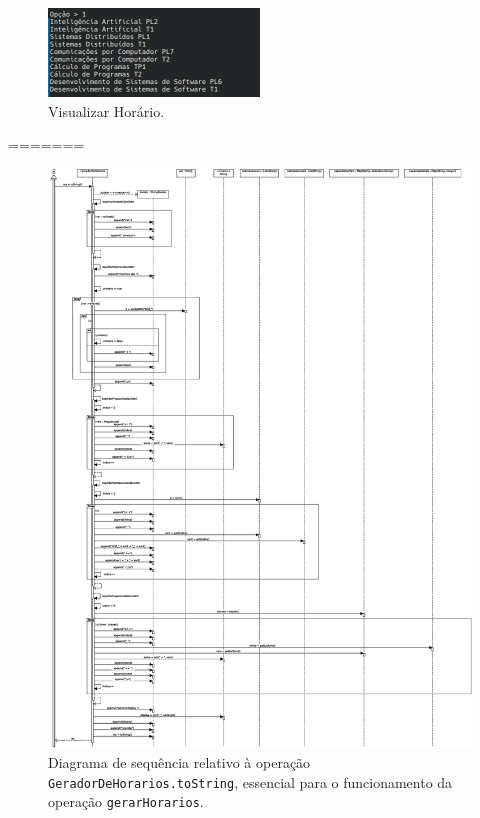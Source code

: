 \documentclass[12pt, a4paper]{article}
\begin{document}
\begin{figure}[H]
    \centering
    \includegraphics[width=0.5\textwidth]{Imagens/Manual/Aluno-1.png}
    \caption{Visualizar Horário.}
\end{figure}
=======
\begin{figure}[H]
    \centering
    \includegraphics[scale=0.32]{Imagens/Modelos/gerarHorariosToString.svg.eps}
    \caption{
        Diagrama de sequência relativo à operação \texttt{GeradorDeHorarios.toString},
        essencial para o funcionamento da operação \texttt{gerarHorarios}.
    }
\end{figure}
\end{document}

